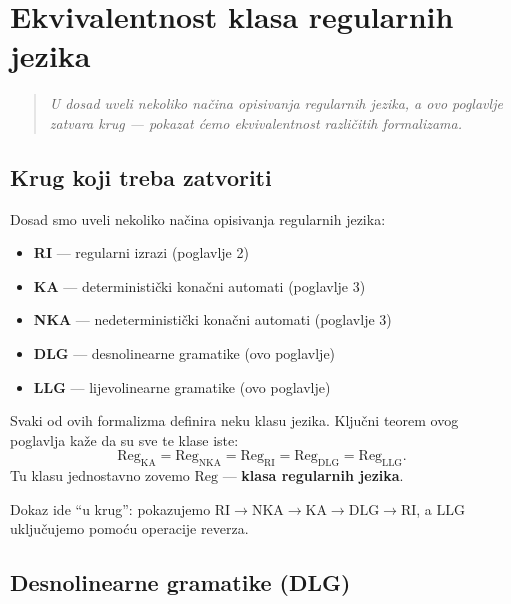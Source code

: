 \chapter{Ekvivalentnost klasa regularnih jezika}
\label{chap:4}

\begin{quote}
\itshape
U dosad uveli nekoliko načina opisivanja regularnih jezika, a ovo
poglavlje zatvara krug — pokazat ćemo ekvivalentnost različitih formalizama.
\end{quote}

\newpage

\section{Krug koji treba zatvoriti}

Dosad smo uveli nekoliko načina opisivanja regularnih jezika:
\begin{itemize}
  \item \textbf{RI} --- regularni izrazi (poglavlje 2)
  \item \textbf{KA} --- deterministički konačni automati (poglavlje 3)
  \item \textbf{NKA} --- nedeterministički konačni automati (poglavlje 3)
  \item \textbf{DLG} --- desnolinearne gramatike (ovo poglavlje)
  \item \textbf{LLG} --- lijevolinearne gramatike (ovo poglavlje)
\end{itemize}

Svaki od ovih formalizma definira neku klasu jezika. Ključni teorem
ovog poglavlja kaže da su sve te klase iste:
\[
  \mathrm{Reg_{KA}} = \mathrm{Reg_{NKA}} = \mathrm{Reg_{RI}}
  = \mathrm{Reg_{DLG}} = \mathrm{Reg_{LLG}}.
\]
Tu klasu jednostavno zovemo $\mathrm{Reg}$ --- \textbf{klasa regularnih
jezika}.

Dokaz ide ``u krug'': pokazujemo $\mathrm{RI} \to \mathrm{NKA} \to
\mathrm{KA} \to \mathrm{DLG} \to \mathrm{RI}$, a $\mathrm{LLG}$
uključujemo pomoću operacije reverza.

\section{Desnolinearne gramatike (DLG)}

